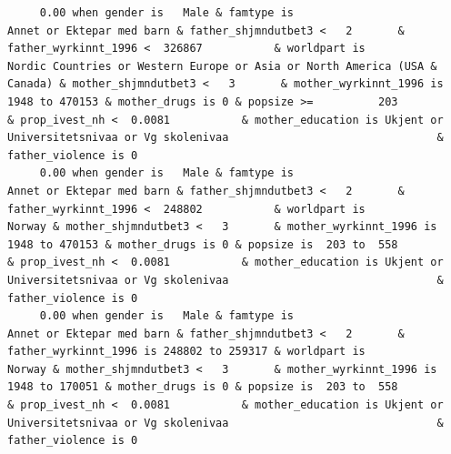 \documentclass[
  letterpaper,
  DIV=11,
  numbers=noendperiod]{scrreprt}
\begin{document}
\begin{verbatim}
     0.00 when gender is   Male & famtype is                                        Annet or Ektepar med barn & father_shjmndutbet3 <   2       & father_wyrkinnt_1996 <  326867           & worldpart is                                                          Nordic Countries or Western Europe or Asia or North America (USA & Canada) & mother_shjmndutbet3 <   3       & mother_wyrkinnt_1996 is   1948 to 470153 & mother_drugs is 0 & popsize >=          203                                                                                                                                    & prop_ivest_nh <  0.0081           & mother_education is Ukjent or Universitetsnivaa or Vg skolenivaa                                & father_violence is 0                                                                                                               
     0.00 when gender is   Male & famtype is                                        Annet or Ektepar med barn & father_shjmndutbet3 <   2       & father_wyrkinnt_1996 <  248802           & worldpart is                                                                                                                              Norway & mother_shjmndutbet3 <   3       & mother_wyrkinnt_1996 is   1948 to 470153 & mother_drugs is 0 & popsize is  203 to  558                                                                                                                                    & prop_ivest_nh <  0.0081           & mother_education is Ukjent or Universitetsnivaa or Vg skolenivaa                                & father_violence is 0                                                                                                               
     0.00 when gender is   Male & famtype is                                        Annet or Ektepar med barn & father_shjmndutbet3 <   2       & father_wyrkinnt_1996 is 248802 to 259317 & worldpart is                                                                                                                              Norway & mother_shjmndutbet3 <   3       & mother_wyrkinnt_1996 is   1948 to 170051 & mother_drugs is 0 & popsize is  203 to  558                                                                                                                                    & prop_ivest_nh <  0.0081           & mother_education is Ukjent or Universitetsnivaa or Vg skolenivaa                                & father_violence is 0                                                                                                               

\end{verbatim}
\end{document}
